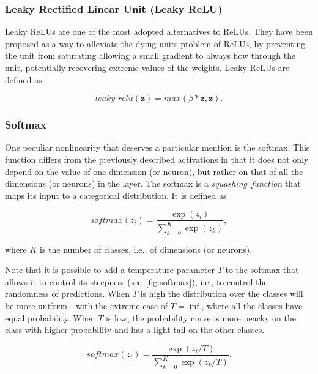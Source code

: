 \subsubsection{Leaky Rectified Linear Unit (Leaky ReLU)}\label{sec:lrelu}
Leaky ReLUs are one of the most adopted alternatives to ReLUs. They have been
proposed as a way to alleviate the dying units problem of ReLUs, by preventing
the unit from saturating allowing a small gradient to always flow through the
unit, potentially recovering extreme values of the weights. Leaky ReLUs are
defined as

\begin{equation}\label{eq:lrelu}
    leaky\_relu(\mathbf{z}) = max(\beta*\mathbf{z}, \mathbf{z}).
\end{equation}

\subsubsection{Softmax}\label{sec:softmax}
One peculiar nonlinearity that deserves a particular mention is the softmax.
This function differs from the previously described activations in that it
does not only depend on the value of one dimension (or neuron), but rather on
that of all the dimensions (or neurons) in the layer. The softmax is a
\emph{squashing~function} that maps its input to a categorical distribution.
It is defined as

\begin{equation}\label{eq:softmax}
    softmax(z_i) = \frac{\exp(z_i)}{\sum_{k=0}^K{\exp(z_k)}},
\end{equation}

\noindent where $K$ is the number of classes, i.e., of dimensions (or neurons).

Note that it is possible to add a temperature parameter $T$ to the softmax that
allows it to control its steepness (see~\autoref{fig:softmax}), i.e., to
control the randomness of predictions. When $T$ is high the distribution over
the classes will be more uniform - with the extreme case of $T = \inf$, where
all the classes have equal probability. When $T$ is low, the probability curve
is more peacky on the class with higher probability and has a light tail on the
other classes.

\begin{equation}\label{eq:softmax_tmp}
    softmax(z_i) = \frac{\exp(z_i / T)}
                        {\sum_{k=0}^K{\exp(z_k / T)}}.
\end{equation}

